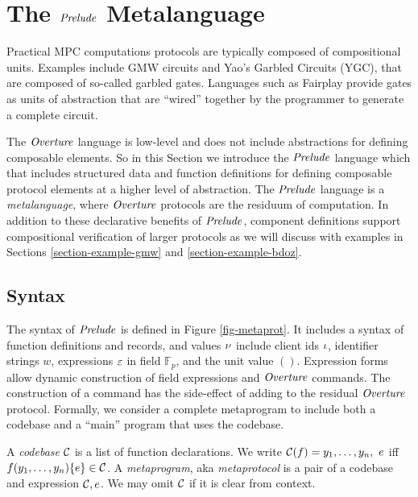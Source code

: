 \section{The $\mathit{Prelude}$ Metalanguage}
\label{section-metalang}

Practical MPC computations protocols are
typically composed of compositional units. Examples include GMW circuits
and Yao's Garbled Circuits (YGC), that are composed of so-called
garbled gates. Languages such as Fairplay \cite{269581} provide gates as
units of abstraction that are ``wired'' together by the programmer to
generate a complete circuit.

The $\mathit{Overture}$ language is low-level and does not include abstractions
for defining composable elements. So in this Section we introduce the
$\mathit{Prelude}$ language which that includes structured data and function
definitions for defining composable protocol elements at a higher
level of abstraction.  The $\mathit{Prelude}$ language is a
\emph{metalanguage}, where $\mathit{Overture}$ protocols are the residuum of
computation. In addition to these declarative benefits of $\mathit{Prelude}$,
component definitions support compositional verification of larger
protocols as we will discuss with examples in Sections
\ref{section-example-gmw} and \ref{section-example-bdoz}.

\metaprotfig

\subsection{Syntax}

The syntax of $\mathit{Prelude}$ is defined in Figure
\ref{fig-metaprot}.  It includes a syntax of function
definitions and records, and values $\nu$ include client ids $\iota$, identifier
strings $w$, expressions $\varepsilon$ in field $\mathbb{F}_p$, and the unit value $()$.
Expression forms allow dynamic construction of field expressions and $\mathit{Overture}$ commands.
The construction of a command has the side-effect of adding to the residual
$\mathit{Overture}$ protocol. Formally, we consider a complete metaprogram to include both a
codebase and a ``main'' program that uses the codebase. 
\begin{definition}
A \emph{codebase} $\mathcal{C}$ is a list of function 
declarations. We write $ \mathcal{C}(f) = y_1,\ldots,y_n,\ e$
iff $f(y_1,\ldots,y_n) \{ e \} \in \mathcal{C}$.
A \emph{metaprogram}, aka \emph{metaprotocol}  is a pair of a 
codebase and expression $\mathcal{C}, e$. We may omit
$\mathcal{C}$ if it is clear from context.  
\end{definition}

